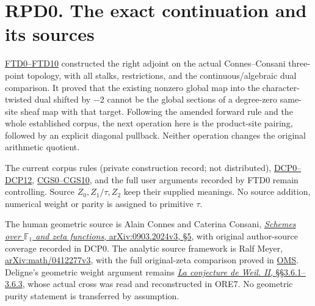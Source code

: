 \section{RPD0. The exact continuation and its
sources}\label{rpd0.-the-exact-continuation-and-its-sources}

\href{https://github.com/KokunoYumeto/zeta-function-research-reader/blob/main/workbenches/splitzero-tandem/continuations/20260925-full-source-tensor-and-original-divisor/counterfactual/FINITE_TOPOLOGY_DUALIZING_COMPLEX.md}{FTD0--FTD10}
constructed the right adjoint on the actual Connes--Consani three-point
topology, with all stalks, restrictions, and the continuous/algebraic
dual comparison. It proved that the existing nonzero global map into the
character-twisted dual shifted by \(-2\) cannot be the global sections
of a degree-zero same-site sheaf map with that target. Following the
amended forward rule and the whole established corpus, the next
operation here is the product-site pairing, followed by an explicit
diagonal pullback. Neither operation changes the original arithmetic
quotient.

The current corpus rules (private construction record; not distributed),
\href{https://github.com/KokunoYumeto/zeta-function-research-reader/blob/36a82ecca98addb8a98b48204e349737856c7223/workbenches/splitzero-tandem/continuations/20260924-cohomology-weight-and-character-lifts/original-character-lifting/tau_lifting_weights_20260924/SOURCE_CC_DOUBLE_PULLBACK.md}{DCP0--DCP12},
\href{https://github.com/KokunoYumeto/zeta-function-research-reader/blob/36a82ecca98addb8a98b48204e349737856c7223/workbenches/splitzero-tandem/continuations/20260924-cohomology-weight-and-character-lifts/original-character-lifting/tau_lifting_weights_20260924/SOURCE_COEFFICIENT_GLUE.md}{CGS0--CGS10},
and the full user arguments recorded by FTD0 remain controlling. Source
\(Z_0,Z_1/\tau,Z_2\) keep their supplied meanings. No source addition,
numerical weight or parity is assigned to primitive \(\tau\).

The human geometric source is Alain Connes and Caterina Consani,
\href{https://arxiv.org/abs/0903.2024v3}{\emph{Schemes over
\(\mathbb F_1\) and zeta functions}, arXiv:0903.2024v3, §5}, with
original author-source coverage recorded in DCP0. The analytic source
framework is Ralf Meyer,
\href{https://arxiv.org/abs/math/0412277v3}{arXiv:math/0412277v3}, with
the full original-zeta comparison proved in
\href{https://github.com/KokunoYumeto/zeta-function-research-reader/blob/36a82ecca98addb8a98b48204e349737856c7223/workbenches/splitzero-tandem/continuations/20260924-cohomology-weight-and-character-lifts/original-character-lifting/tau_lifting_weights_20260924/ORIGINAL_MELLIN_SPECTRAL_SYNTHESIS.md}{OMS}.
Deligne's geometric weight argument remains
\href{https://www.numdam.org/item/PMIHES_1980__52__137_0/}{\emph{La
conjecture de Weil. II}, §§3.6.1--3.6.3}, whose actual cross was read
and reconstructed in ORE7. No geometric purity statement is transferred
by assumption.

